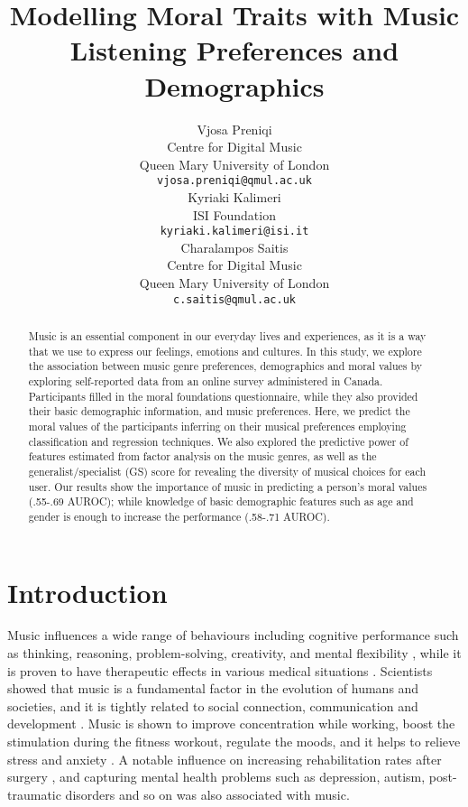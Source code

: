 \documentclass{article}
\title{Modelling Moral Traits with Music Listening Preferences and Demographics}
\author{ 
	Vjosa Preniqi\\
	Centre for Digital Music \\
	Queen Mary University of London\\
	\texttt{vjosa.preniqi@qmul.ac.uk} \\
	\And
	Kyriaki Kalimeri \\
	ISI Foundation\\
	\texttt{kyriaki.kalimeri@isi.it} \\
	\And
	Charalampos Saitis \\
	Centre for Digital Music \\
	Queen Mary University of London\\
	\texttt{c.saitis@qmul.ac.uk} \\
}
\begin{document}
\maketitle

\begin{abstract}
Music is an essential component in our everyday lives and experiences, as it is a way that we use to express our feelings, emotions and cultures. In this study, we explore the association between music genre preferences, demographics and moral values by exploring self-reported data from an online survey administered in Canada. Participants filled in the moral foundations questionnaire, while they also provided their basic demographic information, and music preferences.
Here, we predict the moral values of the participants inferring on their musical preferences employing classification and regression techniques.
We also explored the predictive power of features estimated from factor analysis on the music genres, as well as the generalist/specialist (GS) score for revealing the diversity of musical choices for each user. Our results show the importance of music in predicting a person's moral values (.55-.69 AUROC); while knowledge of basic demographic features such as age and gender is enough to increase the performance (.58-.71 AUROC). 
\end{abstract}



\section{Introduction}

Music influences a wide range of behaviours including cognitive performance such as thinking, reasoning, problem-solving, creativity, and mental flexibility \cite{macdonald2013music}, while it is proven to have therapeutic effects in various medical situations \cite{lin2011mental}.
Scientists showed that music is a fundamental factor in the evolution of humans and societies, and it is tightly related to social connection, communication and development \cite{cross2009evolution,loersch2013unraveling}.
Music is shown to improve concentration while working, boost the stimulation during the fitness workout, regulate the moods, and it helps to relieve stress and anxiety \cite{north2004uses,lonsdale2011we}. 
A notable influence on increasing rehabilitation rates after surgery \cite{hole2015music}, and capturing mental health problems such as depression, autism, post-traumatic disorders and so on \cite{carr2012group,gold2009dose} was also associated with music.
\end{document}
